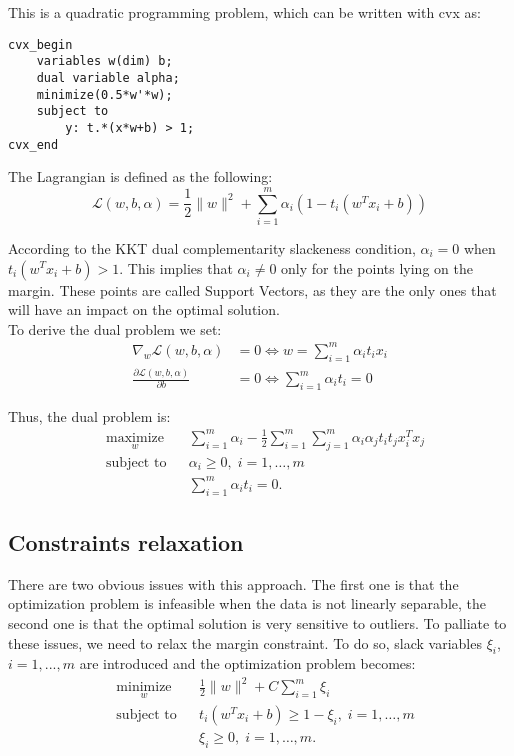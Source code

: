 This is a quadratic programming problem, which can be written with cvx as:
\begin{verbatim}
cvx_begin
    variables w(dim) b; 
    dual variable alpha;
    minimize(0.5*w'*w);
    subject to 
  	    y: t.*(x*w+b) > 1; 
cvx_end
\end{verbatim}
The Lagrangian is defined as the following: 
\begin{equation}
  \mathcal{L}(w,b,\alpha)= \frac{1}{2} \|w\|^2+\sum\limits_{i=1}^m \alpha_i (1-t_i(w^Tx_i+b))
\end{equation}

According to the KKT dual complementarity slackeness condition, $\alpha_i = 0$ when $t_i(w^Tx_i+b) > 1$. This implies that  $\alpha_i \neq 0$ only for the points lying on the margin. These points are called Support Vectors, as they are the only ones that will have an impact on the optimal solution.\\
To derive the dual problem we set:
\begin{equation}
\begin{aligned}
 \nabla _w \mathcal{L}(w,b,\alpha)&=0 \Leftrightarrow w=\sum\limits_{i=1}^m \alpha_i t_i x_i\\
\frac{ \partial \mathcal{L}(w,b,\alpha)}{\partial b}&=0 \Leftrightarrow  \sum\limits_{i=1}^m \alpha_i t_i=0
\end{aligned}
\end{equation}

Thus, the dual problem is:
\begin{equation}
\begin{aligned}
& \underset{w}{\text{maximize}}
& & \sum\limits_{i=1}^m \alpha_i - \frac{1}{2} \sum\limits_{i=1}^m \sum\limits_{j=1}^m \alpha_i \alpha_j t_i t_j x_i^T x_j \\
& \text{subject to}
& & \alpha_i \geq 0, \; i = 1, \ldots, m \\
& & & \sum\limits_{i=1}^m \alpha_i t_i = 0.
\end{aligned}
\end{equation}

\subsection{Constraints relaxation}
There are two obvious issues with this approach. The first one is that the optimization problem is infeasible when the data is not linearly separable, the second one is that the optimal solution is very sensitive to outliers. To palliate to these issues, we need to relax the margin constraint. To do so, slack variables $\xi_i$, $i=1,...,m$ are introduced and the optimization problem becomes:
\begin{equation}
\begin{aligned}
& \underset{w}{\text{minimize}}
& & \frac{1}{2}\|w\|^2 + C\sum\limits_{i=1}^m \xi_i\\
& \text{subject to}
& & t_i(w^Tx_i+b) \geq 1-\xi_i, \; i = 1, \ldots, m\\
& & & \xi_i \geq 0, \; i = 1, \ldots, m.
\label{eq:svm_soft}
\end{aligned}
\end{equation}

